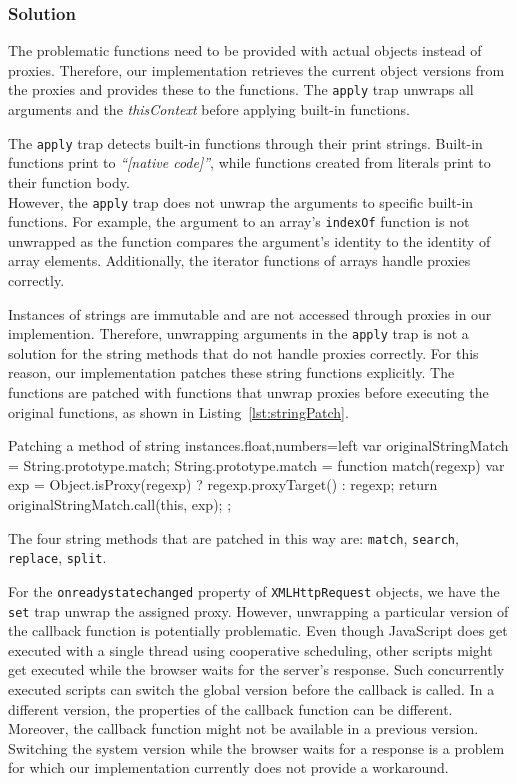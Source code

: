 \subsubsection{Solution}

The problematic functions need to be provided with actual objects instead of proxies.
Therefore, our implementation retrieves the current object versions from the proxies and provides these to the functions.
The \lstinline{apply} trap unwraps all arguments and the \emph{thisContext} before applying built-in functions.

The \lstinline{apply} trap detects built-in functions through their print strings.
Built-in functions print to \emph{``[native code]''}, while functions created from literals print to their function body.\\
However, the \lstinline{apply} trap does not unwrap the arguments to specific built-in functions.
For example, the argument to an array's \lstinline{indexOf} function is not unwrapped as the function compares the argument's identity to the identity of array elements.
Additionally, the iterator functions of arrays handle proxies correctly.

Instances of strings are immutable and are not accessed through proxies in our implemention.
Therefore, unwrapping arguments in the \lstinline{apply} trap is not a solution for the string methods that do not handle proxies correctly.
For this reason, our implementation patches these string functions explicitly.
The functions are patched with functions that unwrap proxies before executing the original functions, as shown in Listing~\ref{lst:stringPatch}.

\begin{code}{Patching a method of string instances.}{float,numbers=left}
var originalStringMatch = String.prototype.match;
String.prototype.match = function match(regexp) {
    var exp = Object.isProxy(regexp) ?
        regexp.proxyTarget() : regexp;
    return originalStringMatch.call(this, exp);
};
\end{code}
\iffalse
\end{verbatim}\fi

The four string methods that are patched in this way are: \lstinline{match}, \lstinline{search}, \lstinline{replace}, \lstinline{split}.

For the \lstinline{onreadystatechanged} property of \lstinline{XMLHttpRequest} objects, we have the \lstinline{set} trap unwrap the assigned proxy.
However, unwrapping a particular version of the callback function is potentially problematic.
Even though JavaScript does get executed with a single thread using cooperative scheduling, other scripts might get executed while the browser waits for the server's response.
Such concurrently executed scripts can switch the global version before the callback is called.
In a different version, the properties of the callback function can be different.
Moreover, the callback function might not be available in a previous version. 
Switching the system version while the browser waits for a response is a problem for which our implementation currently does not provide a workaround.


